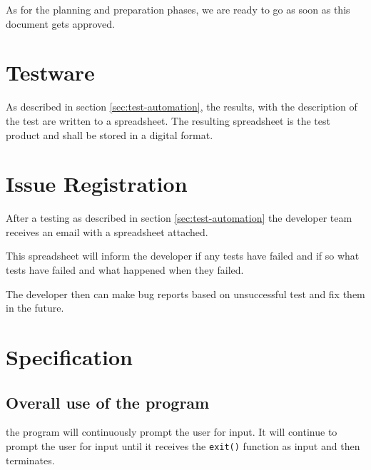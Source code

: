 \documentclass[11pt,a4paper]{article}
\begin{document}

As for the planning and preparation phases, we are ready to go as soon as this document gets approved.


\section{Testware}

As described in section \ref{sec:test-automation}, the results, with
the description of the test are written to a spreadsheet. The
resulting spreadsheet is the test product and shall be stored in a
digital format.


\section{Issue Registration}

After a testing as described in section \ref{sec:test-automation} the
developer team receives an email with a spreadsheet attached.

This spreadsheet will inform the developer if any tests have failed
and if so what tests have failed and what happened when they failed.

The developer then can make bug reports based on unsuccessful test and
fix them in the future.


\appendix
\section{Specification} \label{app:specification}
\subsection{Overall use of the program}
the program will continuously prompt the user for input. It will
continue to prompt the user for input until it receives the
\texttt{exit()} function as input and then terminates.
\end{document}

